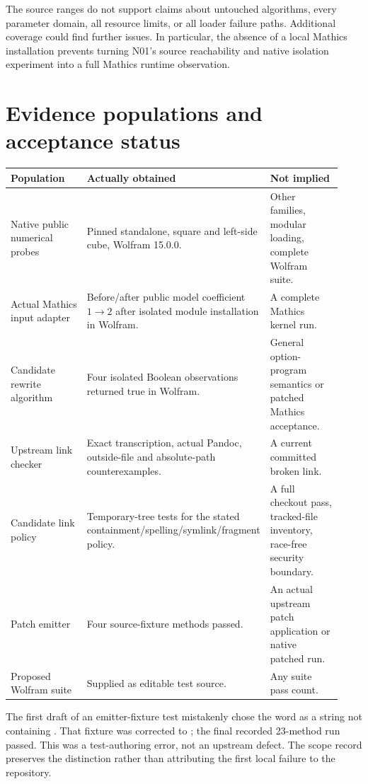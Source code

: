 \documentclass[11pt,letterpaper]{article}
\newcommand{\code}[1]{\texttt{\detokenize{#1}}}
\begin{document}
The source ranges do not support claims about untouched algorithms, every
parameter domain, all resource limits, or all loader failure paths. Additional
coverage could find further issues. In particular, the absence of a local
Mathics installation prevents turning N01's source reachability and native
isolation experiment into a full Mathics runtime observation.

\section{Evidence populations and acceptance status}

\begin{longtable}{@{}P{0.29\linewidth}P{0.37\linewidth}P{0.27\linewidth}@{}}
\toprule
Population & Actually obtained & Not implied\\
\midrule\endhead
Native public numerical probes & Pinned standalone, square and left-side cube, Wolfram 15.0.0. & Other families, modular loading, complete Wolfram suite.\\
Actual Mathics input adapter & Before/after public model coefficient $1\to2$ after isolated module installation in Wolfram. & A complete Mathics kernel run.\\
Candidate rewrite algorithm & Four isolated Boolean observations returned true in Wolfram. & General option-program semantics or patched Mathics acceptance.\\
Upstream link checker & Exact transcription, actual Pandoc, outside-file and absolute-path counterexamples. & A current committed broken link.\\
Candidate link policy & Temporary-tree tests for the stated containment/spelling/symlink/fragment policy. & A full checkout pass, tracked-file inventory, race-free security boundary.\\
Patch emitter & Four source-fixture methods passed. & An actual upstream patch application or native patched run.\\
Proposed Wolfram suite & Supplied as editable test source. & Any suite pass count.\\
\bottomrule
\end{longtable}

The first draft of an emitter-fixture test mistakenly chose the word
\code{none} as a string not containing \code{one}. That fixture was corrected
to \code{absent}; the final recorded 23-method run passed. This was a
test-authoring error, not an upstream defect. The scope record preserves the
distinction rather than attributing the first local failure to the repository.
\end{document}
